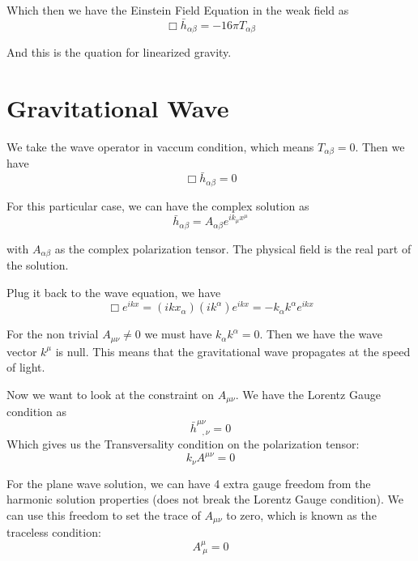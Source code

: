 \documentclass{article}
\begin{document}
Which then we have the Einstein Field Equation in the weak field as
\begin{equation}
    \Box\bar{h}_{\alpha\beta}=-16\pi T_{\alpha\beta}
\end{equation}

And this is the quation for linearized gravity.
\section{Gravitational Wave}

We take the wave operator in vaccum condition, which means $T_{\alpha\beta}=0$. Then we have
\begin{equation}
    \Box\bar{h}_{\alpha\beta}=0
\end{equation}

For this particular case, we can have the complex solution as
\begin{equation}
    \bar{h}_{\alpha\beta}=A_{\alpha\beta}e^{ik_\mu x^\mu}
\end{equation}

with $A_{\alpha\beta}$ as the complex polarization tensor. The physical field is the real part of the solution.

Plug it back to the wave equation, we have
\begin{equation}
    \Box e^{ikx} = (ikx_\alpha)(ik^\alpha)e^{ikx} = -k_\alpha k^\alpha e^{ikx}
\end{equation}

For the non trivial $A_{\mu\nu}\neq 0$ we must have $k_\alpha k^\alpha=0$. Then we have the wave vector $k^\mu$ is null. This means that the gravitational wave propagates at the speed of light.

Now we want to look at the constraint on $A_{\mu\nu}$. We have the Lorentz Gauge condition as
\begin{equation}
    \bar{h}^{\mu\nu}_{~~~,\nu}=0
\end{equation}
Which gives us the Transversality condition on the polarization tensor:
\begin{equation}
    k_\nu A^{\mu\nu}=0
\end{equation}

For the plane wave solution, we can have 4 extra gauge freedom from the harmonic solution properties (does not break the Lorentz Gauge condition). We can use this freedom to set the trace of $A_{\mu\nu}$ to zero, which is known as the traceless condition:
\begin{equation}
    A^\mu_{~\mu}=0
\end{equation}
\end{document}
